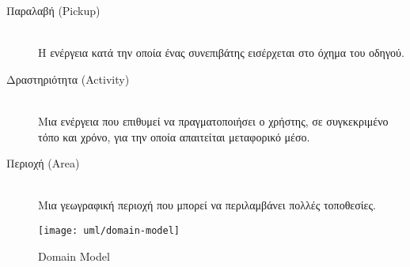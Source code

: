 \begin{description}
    \item[Παραλαβή (Pickup)] \hfill \\
        Η ενέργεια κατά την οποία ένας συνεπιβάτης εισέρχεται στο όχημα του οδηγού.

    \item[Δραστηριότητα (Activity)] \hfill \\
        Μια ενέργεια που επιθυμεί να πραγματοποιήσει ο χρήστης, σε συγκεκριμένο τόπο και χρόνο, για
        την οποία απαιτείται μεταφορικό μέσο.

    \item[Περιοχή (Area)] \hfill \\
        Μια γεωγραφική περιοχή που μπορεί να περιλαμβάνει πολλές τοποθεσίες.
\end{description}

\begin{figure}
    \centering
    \texttt{[image: uml/domain-model]}
    \caption{Domain Model}
\end{figure}


